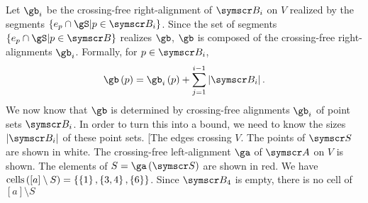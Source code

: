 Let $\gb_i$ be the crossing-free right-alignment of $\pointset B_i$ on $V$ realized by
the segments $\setst{e_p\Intersection \gS}{p\in\pointset B_i}$.
Since the set of segments $\setst{e_p\Intersection \gS}{p\in\pointset B}$ realizes $\gb$,
$\gb$ is composed of the crossing-free right-alignments $\gb_i$. Formally, for
$p\in\pointset B_i$,
\[\gb\of p = \gb_i\of p + \sum{j=1}[i-1] \Cardinality{\pointset B_i}\text.\]
We now know that $\gb$ is determined by crossing-free alignments $\gb_i$ of point sets $\pointset B_i$.
In order to turn this into a bound, we need to know the sizes $\Cardinality{\pointset B_i}$ of these
point sets.
\marginfig[The edges crossing $V$. The points of $\pointset S$ are shown in white. The
crossing-free left-alignment $\ga$ of $\pointset A$ on $V$ is shown.
The elements of $S=\ga\of{\pointset S}$ are shown in red.
We have $\operatorname{cells}\left([a]\setminus S\right)=\left\lbrace \left\lbrace 1\right\rbrace,\left\lbrace 3,4\right\rbrace,\left\lbrace 6\right\rbrace\right\rbrace$.
Since $\pointset B_4$ is empty, there is no cell of ${[a]\setminus S}$
